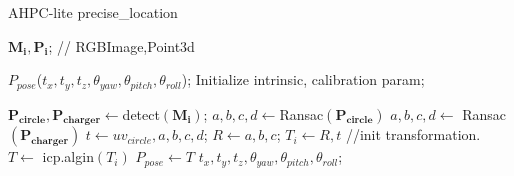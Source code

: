 \documentclass{article}
\begin{document}
\begin{algorithm}[!htb]
	\renewcommand{\algorithmicrequire}{\textbf{Input:}}
	\renewcommand{\algorithmicensure}{\textbf{Output:}}
	\caption{AHPC-lite precise\_location}
	\label{algorithm: masp}
	\begin{algorithmic}[1]
		\REQUIRE
			$\mathbf{M_{i}},\mathbf{P_{i}}$;
        // RGBImage,Point3d

		\ENSURE
			$P_{pose}$($t_x,t_y,t_z,\theta_{yaw},\theta_{pitch},\theta_{roll}$);
        \STATE Initialize intrinsic, calibration param;
        
        \STATE $\mathbf{P_{circle}},\mathbf{P_{charger}}\leftarrow $detect$(\mathbf{M_{i}})$;
        \STATE $a,b,c,d\leftarrow $Ransac$(\mathbf{P_{circle}})$
        \ELSE 
        \STATE $a,b,c,d\leftarrow$ Ransac$(\mathbf{P_{charger}})$
        \ENDIF
        \STATE $t\leftarrow uv_{circle},a,b,c,d$;
        \STATE $R\leftarrow a,b,c$;
        \STATE $T_{i}\leftarrow R,t$
        //init transformation.
        \STATE $T\leftarrow$ icp.algin$(T_{i})$\;
        \STATE $P_{pose}\leftarrow T$\;
        \RETURN $t_x,t_y,t_z,\theta_{yaw},\theta_{pitch},\theta_{roll}$;
	\end{algorithmic}
\end{algorithm}
\end{document}

